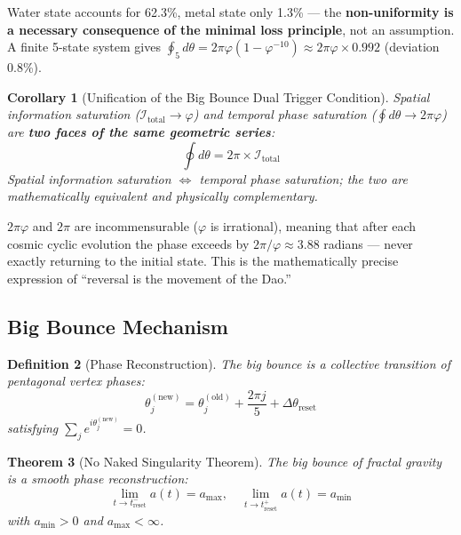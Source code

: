 \documentclass[12pt,a4paper,twocolumn]{article}
\renewcommand{\phi}{\varphi}
\newtheorem{theorem}{Theorem}[section]
\newtheorem{corollary}[theorem]{Corollary}
\newtheorem{definition}[theorem]{Definition}
\begin{document}
Water state accounts for 62.3\%, metal state only 1.3\% --- the \textbf{non-uniformity is a necessary consequence of the minimal loss principle}, not an assumption. A finite 5-state system gives $\oint_5 d\theta = 2\pi\phi(1-\phi^{-10}) \approx 2\pi\phi \times 0.992$ (deviation 0.8\%).

\begin{corollary}[Unification of the Big Bounce Dual Trigger Condition]
\label{cor:dual_trigger}
Spatial information saturation ($\mathcal{I}_{\text{total}} \to \phi$) and temporal phase saturation ($\oint d\theta \to 2\pi\phi$) are \textbf{two faces of the same geometric series}:
\begin{equation}
\oint d\theta = 2\pi \times \mathcal{I}_{\text{total}}
\end{equation}
Spatial information saturation $\Leftrightarrow$ temporal phase saturation; the two are mathematically equivalent and physically complementary.
\end{corollary}

$2\pi\phi$ and $2\pi$ are incommensurable ($\phi$ is irrational), meaning that after each cosmic cyclic evolution the phase exceeds by $2\pi/\phi \approx 3.88$ radians --- never exactly returning to the initial state. This is the mathematically precise expression of ``reversal is the movement of the Dao.''

\subsection{Big Bounce Mechanism}

\begin{definition}[Phase Reconstruction]
The big bounce is a collective transition of pentagonal vertex phases:
\begin{equation}
\theta_j^{(\text{new})} = \theta_j^{(\text{old})} + \frac{2\pi j}{5} + \Delta\theta_{\text{reset}}
\end{equation}
satisfying $\sum_j e^{i\theta_j^{(\text{new})}} = 0$.
\end{definition}

\begin{theorem}[No Naked Singularity Theorem]
The big bounce of fractal gravity is a smooth phase reconstruction:
\begin{equation}
\lim_{t \to t_{\text{reset}}^-} a(t) = a_{\max}, \quad \lim_{t \to t_{\text{reset}}^+} a(t) = a_{\min}
\end{equation}
with $a_{\min} > 0$ and $a_{\max} < \infty$.
\end{theorem}
\end{document}
